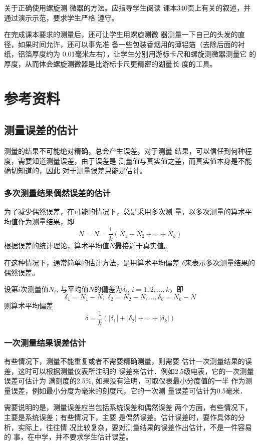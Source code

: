 关于正确使用螺旋测
微器的方法。应指导学生阅读
课本340页上有关的叙述，并通过演示示范，要求学生严格
遵守。

在完成课本要求的测量后，还可让学生用螺旋测微
器测量一下自己的头发的直径，如果时间允许，还可以事先准
备一些包装香烟用的薄铝箔（去除后面的衬纸，铝箔厚度约为
0.01毫米左右），让学生分别用游标卡尺和螺旋测微器测量它
的厚度，从而体会螺旋测微器是比游标卡尺更精密的湖量长
度的工具。

\section{参考资料}
\subsection{测量误差的估计}
测量的结果不可能绝对精确，总会产生误差，对于测量
结果，可以信任到何种程度，需要知道测量误差，由于误差是
测量值与真实值之差，而真实值本身是不能确切知道的，因此
对于测量误差只能是估计。

\subsubsection{多次测量结果偶然误差的估计}
为了减少偶然误差，在可能的情况下，总是采用多次测
量，以多次测量的算术平均值作为测量结果，即
\[N=\overline{N}=\frac{1}{k}(N_1+N_2+\cdots+N_k)\]
根据误差的统计理论，算术平均值$N$最接近于真实值。

在这种情况下，通常简单的估计方法，是用算术平均偏差
$\delta$来表示多次测量结果的偶然误差。

设第$i$次测量值$N_i$, 与平均值$N$的偏差为$\delta_i$, $i=1,2,\ldots,k$，即
\[\delta_1=N_1-N,\; \delta_2=N_2-N,\ldots,\delta_k=N_k-N\]
则算术平均偏差
\[\delta=\frac{1}{k}(|\delta_1|+|\delta_2|+\cdots+|\delta_k|)\]

\subsubsection{一次测量结果误差估计}
有些情况下，测量不能重复或者不需要精确测量，则需要
估计一次测量结果的误差，这时可以根据测量仪表所注明的
误差来估计．例如2.5级电表，它的一次测量误差可估计为
满刻度的2.5\%, 如果没有注明，可取仪表最小分度值的一半
作为测量误差，例如最小分度为毫米的刻度尺，它的一次测
量误差可估计为0.5毫米．

需要说明的是，测量误差应当包括系统误差和偶然误差
两个方面，有些情况下，主要是系统误差；有些情况下，主要
是偶然误差。估计误差时，要作具体的分析，实际上，往往情
况比较复杂，要对测量结果的误差作出估计，不是一件容易的
事，在中学，并不要求学生估计误差。

